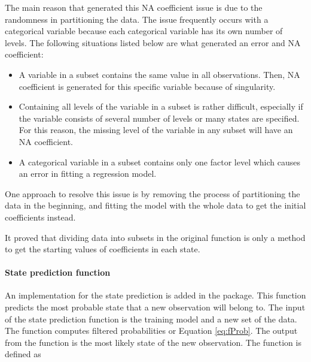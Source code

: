 The main reason that generated this NA coefficient issue is due to
the randomness in partitioning the data. The issue frequently occurs
with a categorical variable because each categorical variable has
its own number of levels. The following situations listed below are
what generated an error and NA coefficient:
\begin{itemize}
\item A variable in a subset contains the same value in all observations.
Then, NA coefficient is generated for this specific variable because
of singularity.
\item Containing all levels of the variable in a subset is rather difficult,
especially if the variable consists of several number of levels or
many states are specified. For this reason, the missing level of the
variable in any subset will have an NA coefficient. 
\item A categorical variable in a subset contains only one factor level
which causes an error in fitting a regression model.
\end{itemize}
One approach to resolve this issue is by removing the process of partitioning
the data in the beginning, and fitting the model with the whole data
to get the initial coefficients instead. %

{} It proved that dividing data into subsets in the original function
is only a method to get the starting values of coefficients in each
state. %

\paragraph{State prediction function}

An implementation for the state prediction is added in the package.
This function predicts the most probable state that a new observation
will belong to. The input of the state prediction function is the
training model and a new set of the data. The function computes filtered
probabilities or Equation \ref{eq:fProb}. The output from the function
is the most likely state of the new observation. The function is defined
as 


